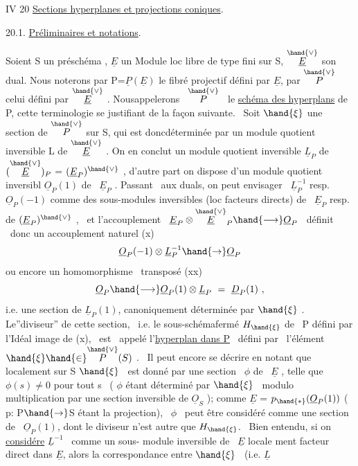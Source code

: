 IV 20 \quad \uline{Sections hyperplanes et projections coniques}.

20.1. \quad \uline{Préliminaires et notations}.

Soient S un \quad préschéma , $\underline{E}$ un Module loc libre de type fini sur S,
$\overset{\hand{\vee}}{\underline{E}}$ son dual. Nous noterons par P=$\underline{P}(\underline{E})$ le fibré projectif défini par $\underline{E}$,
par $\overset{\hand{\vee}}{P}$ celui défini par $\overset{\hand{\vee}}{\underline{E}}$ . Nousappelerons \ $\overset{\hand{\vee}}{P}$ \ le \uline{schéma des hyperplans}
de P, cette terminologie se justifiant de la façon suivante. \ Soit
$\hand{\xi}$ une section de $\overset{\hand{\vee}}{P}$ sur S, qui est donc\hand{/}déterminée par un module quotient
inversible L de $\overset{\hand{\vee}}{\underline{E}}$ . On en conclut un module quotient inversible
$\underline{L}_P$ de$(\overset{\hand{\vee}}{\underline{E}})_P$ = $(\underline{E}_P)^{\hand{\vee}}$ , d'autre part on dispose d'un module quotient inversibl
$\underline{O}_P(1)$ de \ $\underline{E}_P$ . Passant \ aux duals, on peut envisager \ $\underline{L}_P^{-1}$ resp. $\underline{O}_P(-1)$
comme des sous-modules inversibles (loc facteurs directs) de \ $\underline{E}_P$ resp.
de $(\underline{E}_P)^{\hand{\vee}}$ , \ et l'accouplement \ $\underline{E}_P \otimes \overset{\hand{\vee}}{\underline{E}}_P \hand{\longrightarrow} \underline{O}_P$ \ définit \ donc un
accouplement naturel
(x) \[ \underline{O}_P(-1)\otimes\underline{L}_P^{-1} \hand{\to} \underline{O}_P \]
ou encore un homomorphisme \ transposé
\placedmargin{$\|$}
(xx) \[ \underline{O}_P \hand{\longrightarrow} \underline{O}_P(1)\otimes\underline{L}_P \ = \ \underline{D}_P(1) \ , \]
i.e. une section de $\underline{L}_P(1)$, canoniquement déterminée par $\hand{\xi}$ . Le''diviseur''
de cette section, \ i.e. le sous-schémafermé $H_{\hand{\xi}}$ de \ P défini par l'Idéal
image de (x), \ est \ appelé l'\uline{hyperplan dans P} \ défini par \ l'élément
$\hand{\xi} \hand{\in} \overset{\hand{\vee}}{P}(S)$ . \ Il peut encore se décrire en notant que localement sur S 
 \quad $\hand{\xi}$ \ est donné par une section \ $\phi$ de \ $\underline{E}$ ,  telle
 que $\phi(s) \neq 0$ pour tout s \ ( $\phi$ étant déterminé par $\hand{\xi}$ \ modulo
multiplication par une section inversible de $\underline{O}_S$ ); comme $\underline{E}$ = $p_{\hand{*}}(\underline{O}_P(1))$
( p: P$\hand{\to}$S étant la projection), \ $\phi$ \ peut être considéré comme une section
de \ $\underline{O}_P(1)$, dont le diviseur n'est autre que $H_{\hand{\xi}}$. \ Bien entendu, si on
\uline{considére} $\underline{L}^{-1}$ \ comme un sous- module inversible de \ $\underline{E}$ locale
ment facteur direct dans $\underline{E}$, alors la correspondance entre $\hand{\xi}$ \ (i.e. $\underline{L}$ \hand{\unsure{$\xi$,}}

